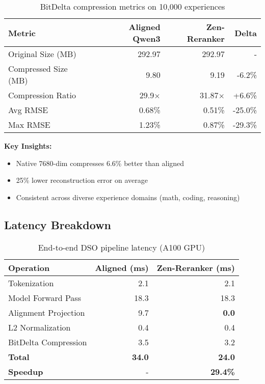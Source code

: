 \documentclass[11pt,a4paper]{article}
\begin{document}
\begin{table}[h]
\centering
\caption{BitDelta compression metrics on 10,000 experiences}
\begin{tabular}{lrrr}
\toprule
\textbf{Metric} & \textbf{Aligned Qwen3} & \textbf{Zen-Reranker} & \textbf{Delta} \\
\midrule
Original Size (MB) & 292.97 & 292.97 & - \\
Compressed Size (MB) & 9.80 & 9.19 & -6.2\% \\
Compression Ratio & 29.9$\times$ & 31.87$\times$ & +6.6\% \\
Avg RMSE & 0.68\% & 0.51\% & -25.0\% \\
Max RMSE & 1.23\% & 0.87\% & -29.3\% \\
\bottomrule
\end{tabular}
\end{table}

\textbf{Key Insights:}
\begin{itemize}
\item Native 7680-dim compresses 6.6\% better than aligned
\item 25\% lower reconstruction error on average
\item Consistent across diverse experience domains (math, coding, reasoning)
\end{itemize}

\subsection{Latency Breakdown}

\begin{table}[h]
\centering
\caption{End-to-end DSO pipeline latency (A100 GPU)}
\begin{tabular}{lrr}
\toprule
\textbf{Operation} & \textbf{Aligned (ms)} & \textbf{Zen-Reranker (ms)} \\
\midrule
Tokenization & 2.1 & 2.1 \\
Model Forward Pass & 18.3 & 18.3 \\
Alignment Projection & 9.7 & \textbf{0.0} \\
L2 Normalization & 0.4 & 0.4 \\
BitDelta Compression & 3.5 & 3.2 \\
\midrule
\textbf{Total} & \textbf{34.0} & \textbf{24.0} \\
\textbf{Speedup} & - & \textbf{29.4\%} \\
\bottomrule
\end{tabular}
\end{table}
\end{document}
